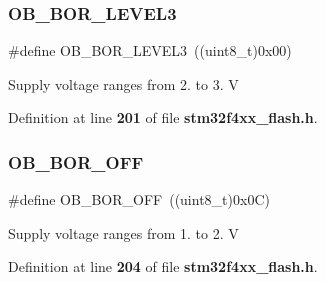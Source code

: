 \subsubsection{O\+B\+\_\+\+B\+O\+R\+\_\+\+L\+E\+V\+E\+L3}
{\footnotesize\ttfamily \#define O\+B\+\_\+\+B\+O\+R\+\_\+\+L\+E\+V\+E\+L3~((uint8\+\_\+t)0x00)}

Supply voltage ranges from 2. to 3. V 

Definition at line \textbf{ 201} of file \textbf{ stm32f4xx\+\_\+flash.\+h}.

\mbox{\label{group__FLASH__BOR__Reset__Level_gaabc231cb1d05a94fe860f67bb5a37b12}} 
\subsubsection{O\+B\+\_\+\+B\+O\+R\+\_\+\+O\+FF}
{\footnotesize\ttfamily \#define O\+B\+\_\+\+B\+O\+R\+\_\+\+O\+FF~((uint8\+\_\+t)0x0\+C)}

Supply voltage ranges from 1. to 2. V 

Definition at line \textbf{ 204} of file \textbf{ stm32f4xx\+\_\+flash.\+h}.

